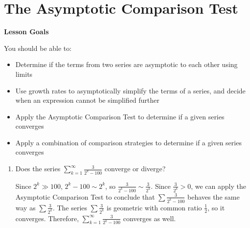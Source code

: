 \documentclass[main]{subfiles}
\begin{document}
\ifSubfilesClassLoaded{%
  \chaptermark{\chaptertwo}
}{}

\section{The Asymptotic Comparison Test} \label{ws2-8}
\begin{framed}
\centerline{\textbf{Lesson Goals}}

You should be able to:
\begin{itemize}
\item Determine if the terms from two series are asymptotic to each other using limits
\item Use growth rates to asymptotically simplify the terms of a series, and decide when an expression cannot be simplified further
\item Apply the Asymptotic Comparison Test to determine if a given series converges
\item Apply a combination of comparison strategies to determine if a given series converges

\end{itemize}
\end{framed} 


\begin{enumerate}
    \item 

    \begin{problem}[1.5in]
    Does the series $\displaystyle \sum_{k=1}^\infty \frac{3}{2^k - 100}$
    converge or diverge?
    \end{problem}

    \begin{solution}
    Since $2^k \gg 100$, $2^k - 100 \sim 2^k$, so $\displaystyle
    \frac{3}{2^k - 100} \sim \frac{3}{2^k}$.  Since $\displaystyle
    \frac{3}{2^k} > 0$, we can apply the Asymptotic Comparison Test to
    conclude that $\displaystyle \sum \frac{3}{2^k - 100}$ behaves the
    same way as $\displaystyle \sum \frac{3}{2^k}$.  The series
    $\displaystyle \sum \frac{3}{2^k}$ is geometric with common ratio
    $\displaystyle \frac{1}{2}$, so it converges.  Therefore,
    $\displaystyle \sum_{k=1}^\infty \frac{3}{2^k - 100}$ converges as
    well.
    \end{solution}
  \end{enumerate}
  
\end{document}
